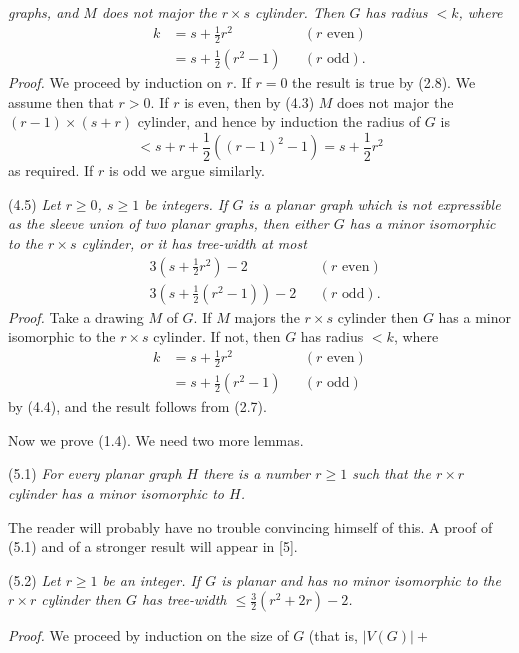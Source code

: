 \noindent \textit{graphs, and $M$ does not major the $r \times s$ cylinder. Then $G$ has radius $<k$, where}
\begin{align*}
k &= s + \frac{1}{2}r^2 && (r\text{ even}) \\
&= s + \frac{1}{2}(r^2 - 1) && (r\text{ odd}).
\end{align*}
\textit{Proof.} We proceed by induction on $r$. If $r = 0$ the result is true by (2.8). We assume then that $r > 0$. If $r$ is even, then by (4.3) $M$ does not major the $(r - 1) \times (s + r)$ cylinder, and hence by induction the radius of $G$ is
\begin{equation*}
< s + r + \frac{1}{2}((r - 1)^2 - 1) = s + \frac{1}{2}r^2
\end{equation*}
as required. If $r$ is odd we argue similarly.

\stmt
(4.5) \textit{Let $r \ge 0$, $s \ge 1$ be integers. If $G$ is a planar graph which is not expressible as the sleeve union of two planar graphs, then either $G$ has a minor isomorphic to the $r \times s$ cylinder, or it has tree-width at most}
\begin{align*}
&3(s + \frac{1}{2}r^2) - 2 && (r\text{ even}) \\
&3(s + \frac{1}{2}(r^2 - 1)) - 2 && (r\text{ odd}).
\end{align*}
\textit{Proof.} Take a drawing $M$ of $G$. If $M$ majors the $r \times s$ cylinder then $G$ has a minor isomorphic to the $r \times s$ cylinder. If not, then $G$ has radius $<k$, where
\begin{align*}
k &= s + \frac{1}{2}r^2 && (r\text{ even}) \\
&= s + \frac{1}{2}(r^2 - 1) && (r\text{ odd})
\end{align*}
by (4.4), and the result follows from (2.7).


Now we prove (1.4). We need two more lemmas.

\stmt
(5.1) \textit{For every planar graph $H$ there is a number $r \ge 1$ such that the $r \times r$ cylinder has a minor isomorphic to $H$.}

The reader will probably have no trouble convincing himself of this. A proof of (5.1) and of a stronger result will appear in [5].

\stmt
(5.2) \textit{Let $r \ge 1$ be an integer. If $G$ is planar and has no minor isomorphic to the $r \times r$ cylinder then $G$ has tree-width $\le \frac{3}{2}(r^2 + 2r) - 2$.}

\textit{Proof.} We proceed by induction on the size of $G$ (that is, $|V(G)| +$
